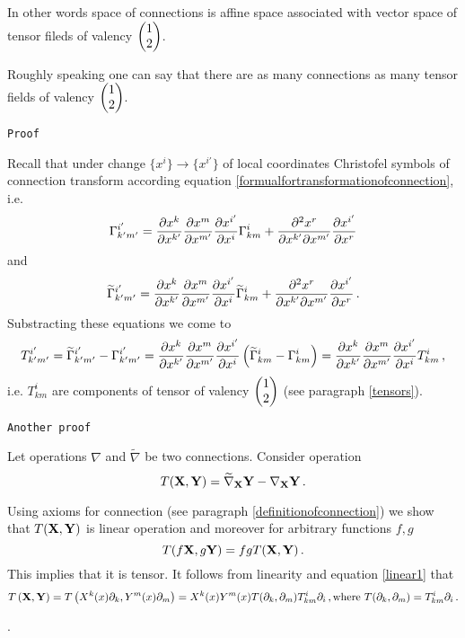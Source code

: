 \documentclass[12pt]{article}
\theoremstyle{theorem}
\numberwithin{equation}{section}
\begin{document}
  In other words {\footnotesize space of connections is affine space
  associated with vector space of tensor fileds of valency
 $\begin{pmatrix}1\cr 2\cr\end{pmatrix}$}.

	 Roughly speaking one can say that there are as many connections
	 as many tensor fields of valency
 $\begin{pmatrix}1\cr 2\cr\end{pmatrix}$.
\medskip




{\tt Proof}

   Recall that under change  $\{x^i\}\to\{x^{i'}\} $
   of local coordinates Christofel symbols of connection
   transform according equation 
   \eqref{formualfortransformationofconnection}, i.e.
               $$
 \Gamma^{i'}_{k'm'}=
          {\partial x^k\over \partial x^{k'}}
          {\partial x^m\over \partial x^{m'}}
          {\partial x^{i'}\over \partial x^i}
          \Gamma_{km}^i+
    {\partial^2  x^r\over \partial x^{k'}\partial x^{m'}}{\partial x^{i'}\over \partial x^r}
	       $$
and	       
\begin{equation}\label{formualfortransformationofconnection2}
    \widetilde \Gamma^{i'}_{k'm'}=
          {\partial x^k\over \partial x^{k'}}
          {\partial x^m\over \partial x^{m'}}
          {\partial x^{i'}\over \partial x^i}
          \widetilde \Gamma_{km}^i+
    {\partial^2  x^r\over \partial x^{k'}\partial x^{m'}}{\partial x^{i'}\over \partial x^r}\,.
 \end{equation}
Substracting these equations we come to
          $$
T^{i'}_{k'm'}=	  
    \widetilde \Gamma^{i'}_{k'm'}-
     \Gamma^{i'}_{k'm'}=  
      {\partial x^k\over \partial x^{k'}}
      {\partial x^m\over \partial x^{m'}}
      {\partial x^{i'}\over \partial x^i}
	  \left
	  (\widetilde \Gamma_{km}^i-
	 \Gamma_{km}^i\right)=
	 {\partial x^k\over \partial x^{k'}}
      {\partial x^m\over \partial x^{m'}}
      {\partial x^{i'}\over \partial x^i}
	  T^i_{km}\,,
	  $$
i.e. ${T^i_{km}}$ are components of tensor of valency
 $\begin{pmatrix}1\cr 2\cr\end{pmatrix}$ (see paragraph \ref{tensors}).
\medskip
{\footnotesize
	 {\tt Another proof}
	
	Let operations  
	$\nabla$ and  $\widetilde \nabla$ be two connections.
	Consider operation
	 \begin{equation*}
		 T({\bf X},{\bf Y})=
		 \widetilde\nabla_{\bf X} {\bf Y}
		 -\nabla_{\bf X} {\bf Y}\,.
	 \end{equation*}


	 Using axioms for connection (see paragraph
	 \ref{definitionofconnection}) we show that
	 $T({\bf X},{\bf Y})$ is linear operation and
	 moreover for arbitrary functions $f,g$
	    \begin{equation}\label{linear1}
	  T(f{\bf X},g{\bf Y})=fgT({\bf X},{\bf Y})\,.  
	    \end{equation}
	 This implies that it is tensor. It follows from
	 linearity and equation \eqref{linear1} that
	           $$
   T\left({\bf X},{\bf Y}\right)=
   T\left(X^k(x)\partial_k,Y^m(x)\partial_m\right)=X^k(x)Y^m(x)T(\partial_k,\partial_m)
	   T_{km}^i\partial_i\,,{\rm where}\,\,
	      T(\partial_k,\partial_m)
	      =T_{km}^i\partial_i\,.
	          $$
}.
\end{document}
